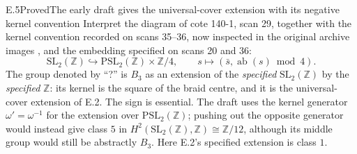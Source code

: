 \begin{statement}{E.5}{Proved}{The early draft gives the universal-cover extension with its negative kernel convention}
Interpret the diagram of cote 140-1, scan 29, together with the
kernel convention recorded on scans 35--36, now inspected in the
original archive images \citep{Grothendieck1981Draft}, and the
embedding specified on scans 20 and 36:
\[
 \mathrm{SL}_2(\mathbb Z)\hookrightarrow
 \mathrm{PSL}_2(\mathbb Z)\times\mathbb Z/4,
 \qquad s\longmapsto(\bar s,\operatorname{ab}(s)\bmod4).
\]
The group denoted by ``?'' is $B_3$ as an extension of the
\emph{specified} $\mathrm{SL}_2(\mathbb Z)$ by the
\emph{specified} $\mathbb Z$: its kernel is the square of the
braid centre, and it is the universal-cover extension of E.2.
The sign is essential.  The draft uses the kernel generator
$\omega'=\omega^{-1}$ for the extension over
$\mathrm{PSL}_2(\mathbb Z)$; pushing out the opposite generator
would instead give class $5$ in
$H^2(\mathrm{SL}_2(\mathbb Z),\mathbb Z)\cong\mathbb Z/12$,
although its middle group would still be abstractly $B_3$.
Here E.2's specified extension is class $1$.
\end{statement}
